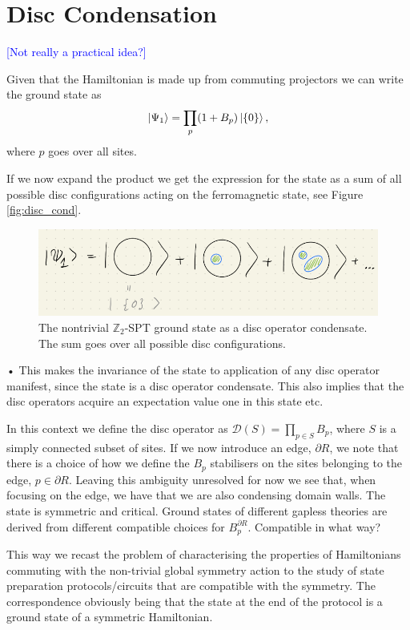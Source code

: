 \documentclass[a4paper,twocolumn,11pt]{quantumarticle}
\newcommand{\jovan}[1]{\textcolor{blue}{[#1]}}
\begin{document}
\section{Disc Condensation}

\jovan{Not really a practical idea?}

Given that the Hamiltonian is made up from commuting projectors we can write the ground state as\begin{equation}
\ket{\Psi_1} = \prod_p (1+B_p)\ket{\{0\}},
\end{equation}
where $p$ goes over all sites.

If we now expand the product we get the expression for the state as a  sum of all possible disc configurations acting on the ferromagnetic state, see Figure \ref{fig:disc_cond}.
\begin{figure}
\centering
\includegraphics[width=\linewidth]{Figures/disc_cond.png}
\caption{The nontrivial $\mathbb{Z}_2$-SPT ground state as a disc operator condensate. The sum goes over all possible disc configurations.}
\end{figure}•
This makes the invariance of the state to application of any disc operator manifest, since the state is a disc operator condensate. This also implies that the disc operators acquire an expectation value one in this state etc.

In this context we define the disc operator as $\mathcal{D}(S) = \prod_{p \in S} B_p$, where $S$ is a simply connected subset of sites. If we now introduce an edge, $\partial R$, we note that there is a choice of how we define the $B_p$ stabilisers on the sites belonging to the edge, $p \in \partial R$. Leaving this ambiguity unresolved for now we see that, when focusing on the edge, we have that we are also condensing domain walls. The state is symmetric and critical. Ground states of different gapless theories are derived from different compatible choices for $B_p^{\partial R}$. Compatible in what way?

This way we recast the problem of characterising the properties of Hamiltonians commuting with the non-trivial global symmetry action to the study of state preparation protocols/circuits that are compatible with the symmetry. The correspondence obviously being that the state at the end of the protocol is a ground state of a symmetric Hamiltonian.

 




\end{document}
